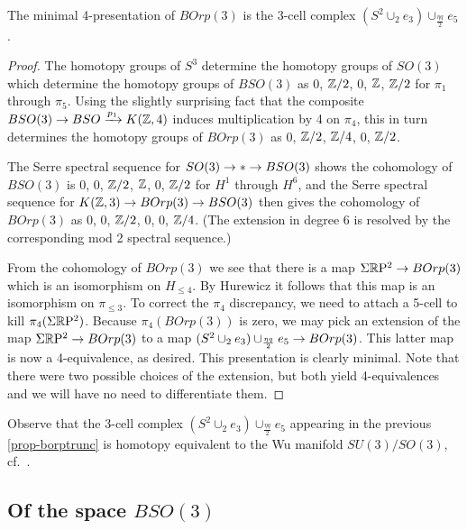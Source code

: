 \documentclass{amsart}
\begin{document}
\begin{proposition} 
\label{prop-borptrunc}
The minimal 4-presentation of $BOrp(3)$ is the 3-cell complex $(S^2 \cup_2 e_3) \cup_{\frac{\eta q}{2}} e_5$.
\end{proposition}
\begin{proof}
The homotopy groups of $S^3$ determine the homotopy groups of $SO(3)$ which determine the homotopy groups of $BSO(3)$ as $0$, $\mathbb Z/2$, $0$, $\mathbb Z$, $\mathbb Z/2$ for $\pi_1$ through $\pi_5$.  Using the slightly surprising fact that the composite $BSO(3) \rightarrow BSO \xrightarrow{p_1} K(\mathbb Z,4)$  induces multiplication by 4 on $\pi_4$, this in turn determines the homotopy groups of $BOrp(3)$ as $0$, $\mathbb Z/2$, $\mathbb Z/4$, $0$, $\mathbb Z/2$.  

The Serre spectral sequence for $SO(3) \rightarrow * \rightarrow BSO(3)$ shows the cohomology of $BSO(3)$ is $0$, $0$, $\mathbb Z/2$, $\mathbb Z$, $0$, $\mathbb Z/2$ for $H^1$ through $H^6$, and the Serre spectral sequence for $K(\mathbb Z,3) \rightarrow BOrp(3) \rightarrow BSO(3)$ then gives the cohomology of $BOrp(3)$ as $0$, $0$, $\mathbb Z/2$, $0$, $0$, $\mathbb Z/4$.  (The extension in degree 6 is resolved by the corresponding mod 2 spectral sequence.)

From the cohomology of $BOrp(3)$ we see that there is a map $\Sigma \mathbb R \mathrm{P}^2 \rightarrow BOrp(3)$ which is an isomorphism on $H_{\leq 4}$.  By Hurewicz it follows that this map is an isomorphism on $\pi_{\leq 3}$.  To correct the $\pi_4$ discrepancy, we need to attach a 5-cell to kill $\pi_4(\Sigma \mathbb R \mathrm{P}^2)$.  Because $\pi_4(BOrp(3))$ is zero, we may pick an extension of the map $\Sigma \mathbb R \mathrm{P}^2 \rightarrow BOrp(3)$ to a map $(S^2 \cup_2 e_3) \cup_{\frac{\eta q}{2}} e_5 \rightarrow BOrp(3)$.  This latter map is now a 4-equivalence, as desired.  This presentation is clearly minimal.  Note that there were two possible choices of the extension, but both yield 4-equivalences and we will have no need to differentiate them.
\end{proof}

\begin{remark} \label{rem:WuManifold}
Observe that the 3-cell complex $(S^2 \cup_2 e_3) \cup_{\frac{\eta q}{2}} e_5$ appearing in the previous \cref{prop-borptrunc} is homotopy equivalent to the Wu manifold $SU(3)/SO(3)$, cf.\ \cite[Eg.\ 6.15]{wu}. %
\end{remark}


\subsection{Of the space $BSO(3)$}
\end{document}
